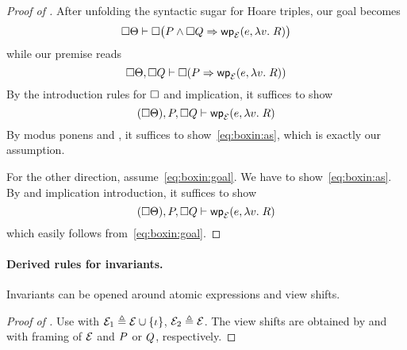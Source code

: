 \begin{proof}[Proof of ]
  After unfolding the syntactic sugar for Hoare triples, our goal becomes
  \begin{equation}\label{eq:boxin:goal}
    \always\pfctx \proves \always\bigl(\prop\land\always \propB \Ra \dynA{\expr}{\Lam\val. \propC}{\mask}\bigr)
  \end{equation}
  while our premise reads
  \begin{equation}\label{eq:boxin:as}
    \always\pfctx, \always\propB \proves \always(\prop \Ra \dynA{\expr}{\Lam\val. \propC}{\mask})
  \end{equation}
  By the introduction rules for $\Box{}$ and implication, it suffices to show
  \[  (\always\pfctx), \prop,\always \propB \proves \dynA{\expr}{\Lam\val. \propC}{\mask} \]
  By modus ponens and , it suffices to show~\eqref{eq:boxin:as}, which is exactly our assumption.
  
  For the other direction, assume~\eqref{eq:boxin:goal}. We have to show~\eqref{eq:boxin:as}. By  and implication introduction, it suffices to show
  \[  (\always\pfctx), \prop,\always \propB \proves \dynA{\expr}{\Lam\val. \propC}{\mask} \]
  which easily follows from~\eqref{eq:boxin:goal}.
\end{proof}

\paragraph{Derived rules for invariants.}
Invariants can be opened around atomic expressions and view shifts.


\begin{proof}[Proof of ]
  Use  with $\mathcal{E}_1 \triangleq \mathcal{E} \cup \{\iota\}$, $\mathcal{E}_2 \triangleq \mathcal{E}$.
  The view shifts are obtained by  and  with framing of $\mathcal{E}$ and $P$ or $Q$, respectively.
\end{proof}

